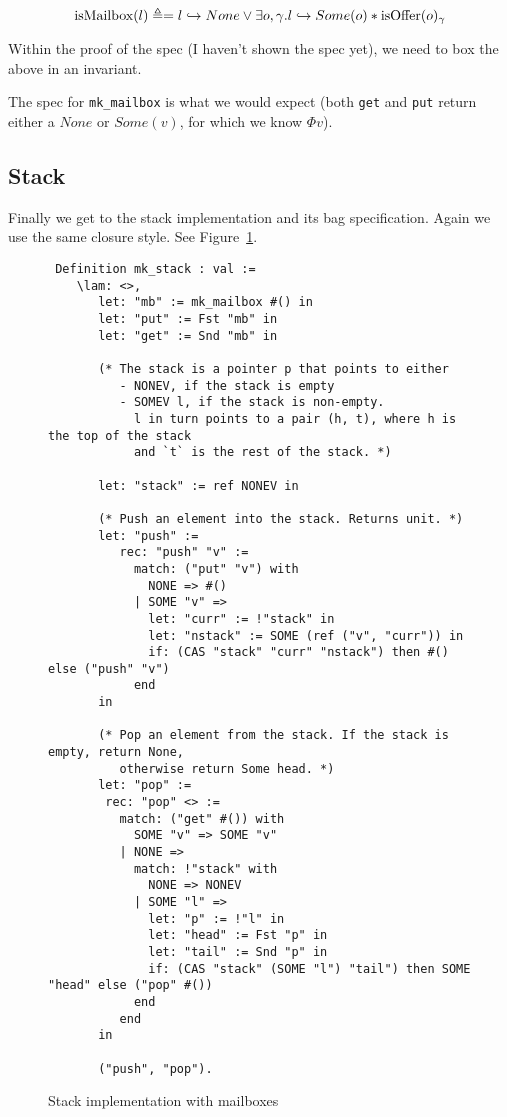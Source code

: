\[
\text{isMailbox}(l) \triangleq = l \hookrightarrow None \lor \exists o, \gamma. l \hookrightarrow Some(o) * \text{isOffer}(o)_{\gamma}
\]

Within the proof of the spec (I haven't shown the spec yet), we need to box the above in an invariant.

The spec for \texttt{mk\_mailbox} is what we would expect (both \texttt{get} and \texttt{put} return either a $None$ or $Some(v)$, for which we know $\Phi v$). 

\subsection{Stack}

Finally we get to the stack implementation and its bag specification. Again we use the same closure style. See Figure~\ref{figure:stack-code}.

\begin{figure}
\begin{verbatim}
 Definition mk_stack : val :=
    \lam: <>,
       let: "mb" := mk_mailbox #() in
       let: "put" := Fst "mb" in
       let: "get" := Snd "mb" in

       (* The stack is a pointer p that points to either
          - NONEV, if the stack is empty
          - SOMEV l, if the stack is non-empty.
            l in turn points to a pair (h, t), where h is the top of the stack
            and `t` is the rest of the stack. *)
       
       let: "stack" := ref NONEV in

       (* Push an element into the stack. Returns unit. *)
       let: "push" :=
          rec: "push" "v" :=
            match: ("put" "v") with
              NONE => #()
            | SOME "v" =>
              let: "curr" := !"stack" in
              let: "nstack" := SOME (ref ("v", "curr")) in
              if: (CAS "stack" "curr" "nstack") then #() else ("push" "v")
            end
       in

       (* Pop an element from the stack. If the stack is empty, return None,
          otherwise return Some head. *)
       let: "pop" :=
        rec: "pop" <> :=
          match: ("get" #()) with
            SOME "v" => SOME "v"
          | NONE =>
            match: !"stack" with
              NONE => NONEV
            | SOME "l" =>
              let: "p" := !"l" in
              let: "head" := Fst "p" in
              let: "tail" := Snd "p" in
              if: (CAS "stack" (SOME "l") "tail") then SOME "head" else ("pop" #())
            end
          end
       in

       ("push", "pop").
\end{verbatim}
\caption{Stack implementation with mailboxes}
\label{figure:stack-code}
\end{figure}

